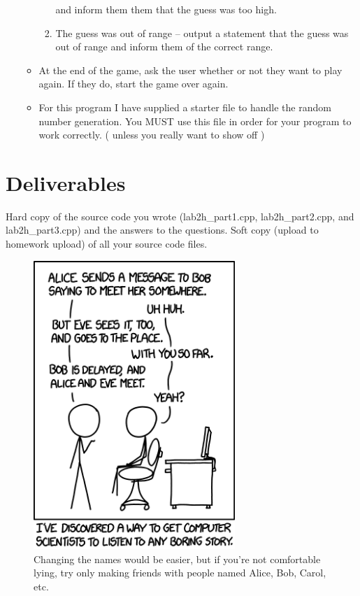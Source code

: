 \documentclass[letterpaper,12pt]{article}
\begin{document}
\begin{enumerate}
\begin{itemize}
\begin{enumerate}
                              and inform them them that the guess was too high.
                        \item The guess was out of range – output a statement that the guess was out
                              of range and inform them of the correct range.
                    \end{enumerate}
                \item At the end of the game, ask the user whether or not they want to play again.
                      If they do, start the game over again.
                \item For this program I have supplied a starter file to handle the random number
                      generation. You MUST use this file in order for your program to work correctly.
                      ( unless you really want to show off )
            \end{itemize}
\end{enumerate}
\section*{Deliverables}
Hard copy of the source code you wrote (lab2h\_part1.cpp, lab2h\_part2.cpp, and lab2h\_part3.cpp)
and the answers to the questions. Soft copy (upload to homework upload) of all your source code files.

\begin{figure}[ht!]
	\centering
	\includegraphics[width=3in]{protocol.png}
    \caption*{Changing the names would be easier, but if you're not comfortable lying, try only making friends with people named Alice, Bob, Carol, etc.}
\end{figure}
\end{document}
